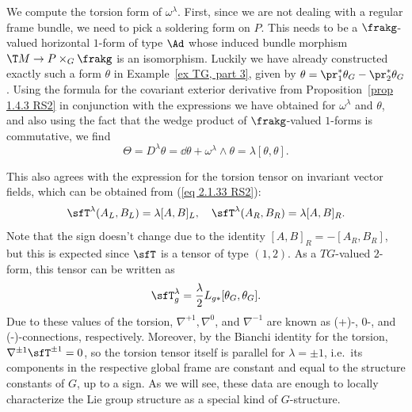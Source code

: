 \begin{example}\label{ex connections on G, part 4}
    We compute the torsion form of $\omega^\lambda$. First, since we are not dealing with a regular frame bundle, we need to pick a soldering form on $P$. This needs to be a $\frakg$-valued horizontal $1$-form of type $\Ad$ whose induced bundle morphism $\T M\to P\times_G \frakg$ is an isomorphism. Luckily we have already constructed exactly such a form $\theta$ in Example~\ref{ex TG, part 3}, given by $\theta=\pr_1^\ast\theta_G-\pr_2^\ast\theta_G$. 
    Using the formula for the covariant exterior derivative from Proposition~\ref{prop 1.4.3 RS2} in conjunction with the expressions we have obtained for $\omega^\lambda$ and $\theta$, and also using the fact that the wedge product of $\frakg$-valued $1$-forms is commutative, we find
    \[\Theta=D^\lambda \theta=\dd \theta+\omega^\lambda\wedge \theta=\lambda[\theta,\theta].\]

    This also agrees with the expression for the torsion tensor on invariant vector fields, which can be obtained from (\ref{eq 2.1.33 RS2}):
    \[\sfT^\lambda(A_L,B_L)=\lambda[A,B]_L,\quad \sfT^\lambda(A_R,B_R)=\lambda [A,B]_R.\]
    Note that the sign doesn't change due to the identity $[A,B]_R=-[A_R,B_R]$, but this is expected since $\sfT$ is a tensor of type $(1,2)$. 
    As a $TG$-valued $2$-form, this tensor can be written as 
    \[\sfT^\lambda_g=\frac{\lambda}{2} L_{g\ast}[\theta_G,\theta_G].\label{3791731}\]
    Due to these values of the torsion, $\nabla^{+1},\nabla^0$, and $\nabla^{-1}$ are known as (+)-, 0-, and (-)-connections, respectively. 
    Moreover, by the  Bianchi identity for the torsion, $\nabla^{\pm 1}\sfT^{\pm 1}=0$, so the torsion tensor itself is parallel for $\lambda=\pm 1$, i.e.\ its components in the respective global frame are constant and equal to the structure constants of $G$, up to a sign. As we will see, these data are enough to locally characterize the Lie group structure as a special kind of $G$-structure.


\end{example}
